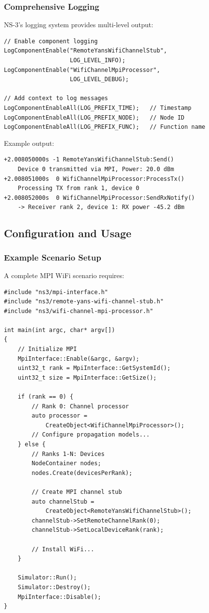 \subsubsection{Comprehensive Logging}

NS-3's logging system provides multi-level output:

\begin{lstlisting}[style=cpp, caption={Logging levels for debugging}]
// Enable component logging
LogComponentEnable("RemoteYansWifiChannelStub", 
                   LOG_LEVEL_INFO);
LogComponentEnable("WifiChannelMpiProcessor", 
                   LOG_LEVEL_DEBUG);

// Add context to log messages
LogComponentEnableAll(LOG_PREFIX_TIME);   // Timestamp
LogComponentEnableAll(LOG_PREFIX_NODE);   // Node ID
LogComponentEnableAll(LOG_PREFIX_FUNC);   // Function name
\end{lstlisting}

Example output:
\begin{verbatim}
+2.008050000s -1 RemoteYansWifiChannelStub:Send() 
    Device 0 transmitted via MPI, Power: 20.0 dBm
+2.008051000s  0 WifiChannelMpiProcessor:ProcessTx()
    Processing TX from rank 1, device 0
+2.008052000s  0 WifiChannelMpiProcessor:SendRxNotify()
    -> Receiver rank 2, device 1: RX power -45.2 dBm
\end{verbatim}

\subsection{Configuration and Usage}

\subsubsection{Example Scenario Setup}

A complete MPI WiFi scenario requires:

\begin{lstlisting}[style=cpp, caption={Minimal MPI WiFi setup}]
#include "ns3/mpi-interface.h"
#include "ns3/remote-yans-wifi-channel-stub.h"
#include "ns3/wifi-channel-mpi-processor.h"

int main(int argc, char* argv[])
{
    // Initialize MPI
    MpiInterface::Enable(&argc, &argv);
    uint32_t rank = MpiInterface::GetSystemId();
    uint32_t size = MpiInterface::GetSize();
    
    if (rank == 0) {
        // Rank 0: Channel processor
        auto processor = 
            CreateObject<WifiChannelMpiProcessor>();
        // Configure propagation models...
    } else {
        // Ranks 1-N: Devices
        NodeContainer nodes;
        nodes.Create(devicesPerRank);
        
        // Create MPI channel stub
        auto channelStub = 
            CreateObject<RemoteYansWifiChannelStub>();
        channelStub->SetRemoteChannelRank(0);
        channelStub->SetLocalDeviceRank(rank);
        
        // Install WiFi...
    }
    
    Simulator::Run();
    Simulator::Destroy();
    MpiInterface::Disable();
}
\end{lstlisting}

